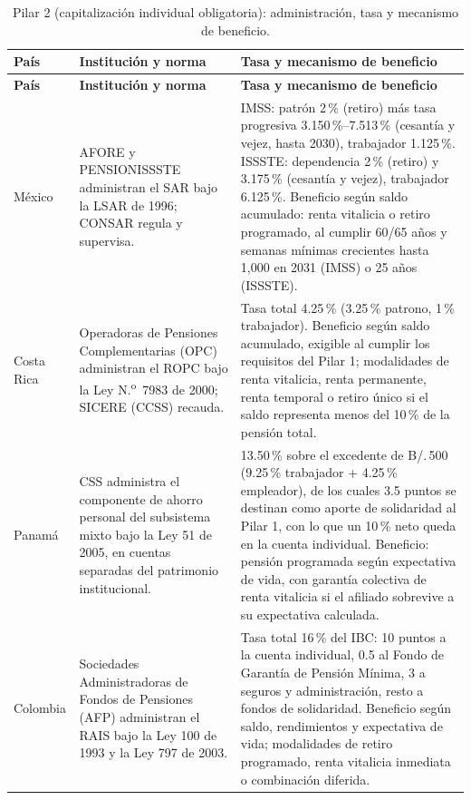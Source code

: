 \documentclass[12pt, letterpaper]{article}
\begin{document}
\begin{xltabular}{\textwidth}{P{1.7cm}Y Y}
\caption{Pilar 2 (capitalización individual obligatoria): administración, tasa y mecanismo de beneficio.}
\label{tab:param_pilar2}\\
\toprule
\textbf{País} & \textbf{Institución y norma} & \textbf{Tasa y mecanismo de beneficio} \\
\midrule
\endfirsthead

\toprule
\textbf{País} & \textbf{Institución y norma} & \textbf{Tasa y mecanismo de beneficio} \\
\midrule
\endhead

\bottomrule
\endfoot

México &
AFORE y PENSIONISSSTE administran el SAR bajo la LSAR de 1996; CONSAR regula y supervisa. &
IMSS: patrón 2\,\% (retiro) más tasa progresiva 3.150\,\%--7.513\,\% (cesantía y vejez, hasta 2030), trabajador 1.125\,\%. ISSSTE: dependencia 2\,\% (retiro) y 3.175\,\% (cesantía y vejez), trabajador 6.125\,\%. Beneficio según saldo acumulado: renta vitalicia o retiro programado, al cumplir 60/65 años y semanas mínimas crecientes hasta 1{,}000 en 2031 (IMSS) o 25 años (ISSSTE). \\

Costa Rica &
Operadoras de Pensiones Complementarias (OPC) administran el ROPC bajo la Ley N.\textsuperscript{o}~7983 de 2000; SICERE (CCSS) recauda. &
Tasa total 4.25\,\% (3.25\,\% patrono, 1\,\% trabajador). Beneficio según saldo acumulado, exigible al cumplir los requisitos del Pilar 1; modalidades de renta vitalicia, renta permanente, renta temporal o retiro único si el saldo representa menos del 10\,\% de la pensión total. \\

Panamá &
CSS administra el componente de ahorro personal del subsistema mixto bajo la Ley 51 de 2005, en cuentas separadas del patrimonio institucional. &
13.50\,\% sobre el excedente de B/.\,500 (9.25\,\% trabajador + 4.25\,\% empleador), de los cuales 3.5 puntos se destinan como aporte de solidaridad al Pilar 1, con lo que un 10\,\% neto queda en la cuenta individual. Beneficio: pensión programada según expectativa de vida, con garantía colectiva de renta vitalicia si el afiliado sobrevive a su expectativa calculada. \\

Colombia &
Sociedades Administradoras de Fondos de Pensiones (AFP) administran el RAIS bajo la Ley 100 de 1993 y la Ley 797 de 2003. &
Tasa total 16\,\% del IBC: 10 puntos a la cuenta individual, 0.5 al Fondo de Garantía de Pensión Mínima, 3 a seguros y administración, resto a fondos de solidaridad. Beneficio según saldo, rendimientos y expectativa de vida; modalidades de retiro programado, renta vitalicia inmediata o combinación diferida. \\


\end{xltabular}
\end{document}
